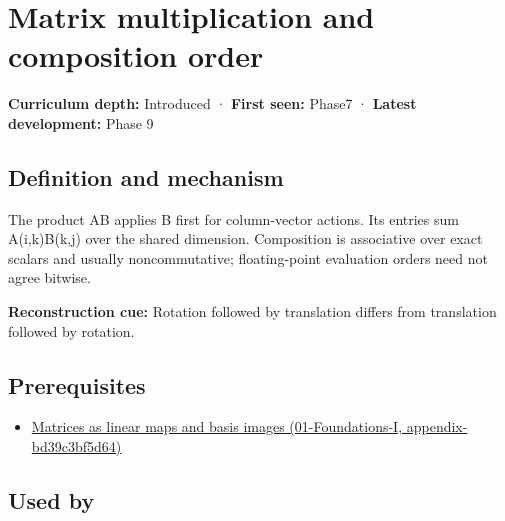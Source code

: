 \hypertarget{appendix-ab31ef447dbf}{}
\section{Matrix multiplication and composition order}\label{appendix-ab31ef447dbf-matrix-multiplication-and-composition-order}

\textbf{Curriculum depth:} Introduced · \textbf{First seen:} Phase7 · \textbf{Latest development:} Phase 9

\subsection{Definition and mechanism}\label{appendix-ab31ef447dbf-definition-and-mechanism}

The product AB applies B first for column-vector actions. Its entries sum A(i,k)B(k,j) over the shared dimension. Composition is associative over exact scalars and usually noncommutative; floating-point evaluation orders need not agree bitwise.

\textbf{Reconstruction cue:} Rotation followed by translation differs from translation followed by rotation.

\subsection{Prerequisites}\label{appendix-ab31ef447dbf-prerequisites}

\begin{itemize}
\tightlist
\item
  \href{../01-Foundations-I/main.pdf\#nameddest=appendix-bd39c3bf5d64}{Matrices as linear maps and basis images (01-Foundations-I, appendix-bd39c3bf5d64)}
\end{itemize}

\subsection{Used by}\label{appendix-ab31ef447dbf-used-by}

